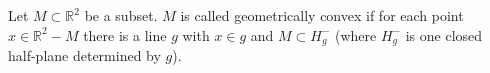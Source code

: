 Let $M \subset \mathbb{R}^2$ be a subset. $M$ is called geometrically convex if for each point $x \in \mathbb{R}^2 - M$ there is a line $g$ with $x \in g$ and $M \subset H_g^-$ (where $H_g^-$ is one closed half-plane determined by $g$).
